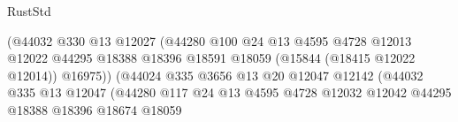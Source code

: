 \begin{lexlean}{RustStd}
\begin{coremodule}
                                                  (@44032
                                                    @330
                                                    @13
                                                    @12027
                                                    (@44280
                                                      @100
                                                      @24
                                                      @13
                                                      @4595
                                                      @4728
                                                      @12013
                                                      @12022
                                                      @44295
                                                      @18388
                                                      @18396
                                                      @18591
                                                      @18059
                                                      (@15844 (@18415 @12022 @12014))
                                                      @16975))
                                                  (@44024
                                                    @335
                                                    @3656
                                                    @13
                                                    @20
                                                    @12047
                                                    @12142
                                                    (@44032
                                                      @335
                                                      @13
                                                      @12047
                                                      (@44280
                                                        @117
                                                        @24
                                                        @13
                                                        @4595
                                                        @4728
                                                        @12032
                                                        @12042
                                                        @44295
                                                        @18388
                                                        @18396
                                                        @18674
                                                        @18059

\end{coremodule}
\end{lexlean}

